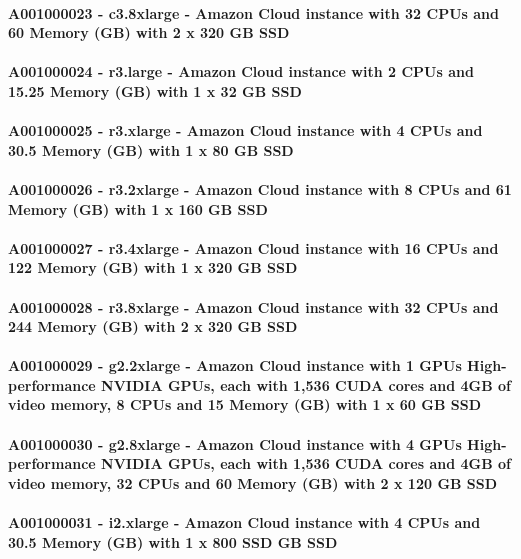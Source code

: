 \paragraph{A001000023 - c3.8xlarge - Amazon Cloud instance with 32 CPUs and 60 Memory (GB) with 2 x 320 GB SSD}
\paragraph{A001000024 - r3.large - Amazon Cloud instance with 2 CPUs and 15.25 Memory (GB) with 1 x 32 GB SSD}
\paragraph{A001000025 - r3.xlarge - Amazon Cloud instance with 4 CPUs and 30.5 Memory (GB) with 1 x 80 GB SSD}
\paragraph{A001000026 - r3.2xlarge - Amazon Cloud instance with 8 CPUs and 61 Memory (GB) with 1 x 160 GB SSD}
\paragraph{A001000027 - r3.4xlarge - Amazon Cloud instance with 16 CPUs and 122 Memory (GB) with 1 x 320 GB SSD}
\paragraph{A001000028 - r3.8xlarge - Amazon Cloud instance with 32 CPUs and 244 Memory (GB) with 2 x 320 GB SSD}
\paragraph{A001000029 - g2.2xlarge - Amazon Cloud instance with 1 GPUs High-performance NVIDIA GPUs, each with 1,536 CUDA cores and 4GB of video memory, 8 CPUs and 15 Memory (GB) with 1 x 60 GB SSD}
\paragraph{A001000030 - g2.8xlarge - Amazon Cloud instance with 4 GPUs High-performance NVIDIA GPUs, each with 1,536 CUDA cores and 4GB of video memory, 32 CPUs and 60 Memory (GB) with 2 x 120 GB SSD}
\paragraph{A001000031 - i2.xlarge - Amazon Cloud instance with 4 CPUs and 30.5 Memory (GB) with 1 x 800 SSD GB SSD}
